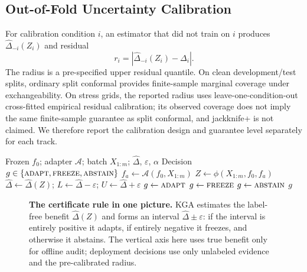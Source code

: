 
\subsection{Out-of-Fold Uncertainty Calibration}
For calibration condition $i$, an estimator that did not train on $i$ produces $\widehat\Delta_{-i}(Z_i)$ and residual
\[
r_i=|\widehat\Delta_{-i}(Z_i)-\Delta_i|.
\]
The radius is a pre-specified upper residual quantile. On clean development/test splits, ordinary split conformal provides finite-sample marginal coverage under exchangeability. On stress grids, the reported radius uses leave-one-condition-out cross-fitted empirical residual calibration; its observed coverage does not imply the same finite-sample guarantee as split conformal, and jackknife+ is not claimed. We therefore report the calibration design and guarantee level separately for each track.

\begin{algorithm}[t]
\caption{\textsc{KGA}: Knowability-Guided Adaptation}
\label{alg:kga}
\begin{algorithmic}[1]
\Require Frozen $f_0$; adapter $\mathcal{A}$; batch $X_{1:m}$; $\widehat\Delta$, $\varepsilon$, $\alpha$
\Ensure Decision $g\in\{\textsc{adapt},\textsc{freeze},\textsc{abstain}\}$
\State $f_a \leftarrow \mathcal{A}(f_0, X_{1:m})$
\State $Z \leftarrow \phi(X_{1:m}, f_0, f_a)$
\State $\widehat\Delta \leftarrow \widehat\Delta(Z)$;\;
  $L \leftarrow \widehat\Delta-\varepsilon$;\; $U \leftarrow \widehat\Delta+\varepsilon$
 \State $g\leftarrow\textsc{adapt}$
 \State $g\leftarrow\textsc{freeze}$
\Else \State $g\leftarrow\textsc{abstain}$
\EndIf
\State \Return $g$
\end{algorithmic}
\end{algorithm}

\begin{figure}[t]\centering
{}
\caption{\textbf{The certificate rule in one picture.} \textsc{KGA} estimates the label-free benefit
$\widehat\Delta(Z)$ and forms an interval $\widehat\Delta\pm\varepsilon$: if the interval is entirely
positive it adapts, if entirely negative it freezes, and otherwise it abstains. The vertical axis here
uses true benefit only for offline audit; deployment decisions use only unlabeled evidence and the
pre-calibrated radius.}
\label{fig:certificate}
\end{figure}

